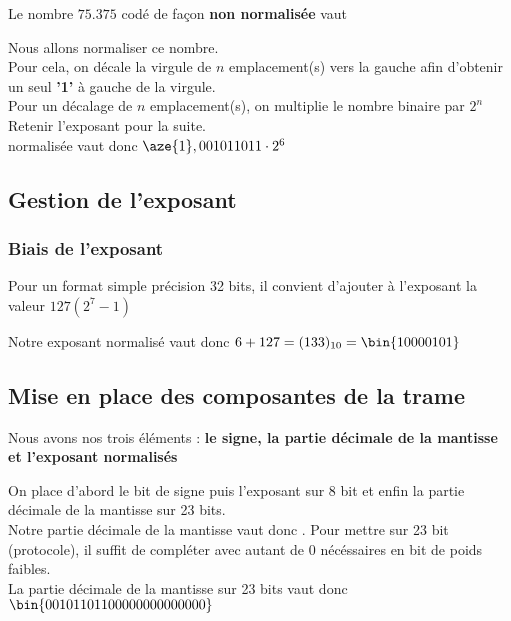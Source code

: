\documentclass[12pt]{report}
\renewcommand{\bold}[1]{\textbf{#1}}
\begin{document}
Le nombre $75.375$ codé de façon \bold{non normalisée} vaut 

Nous allons normaliser ce nombre. \\

Pour cela, on décale la virgule de $n$ emplacement(s) vers la gauche afin d'obtenir un seul \bold{'1'} à gauche de la virgule. \\

Pour un décalage de $n$ emplacement(s), on multiplie le nombre binaire par $2^n$ \\

Retenir l'exposant  pour la suite. \\

 normalisée vaut donc $\aze{1},001011011 \cdot 2^6 $ 

\subsection{Gestion de l'exposant}

\subsubsection{Biais de l'exposant}

Pour un format simple précision 32 bits, il convient d'ajouter à l'exposant la valeur $127 (2^7-1)$

Notre exposant normalisé vaut donc $6+127=(133)_{10} = \bin{10000101}$

\subsection{Mise en place des composantes de la trame}

Nous avons nos trois éléments : \bold{le signe, la partie décimale de la mantisse et l'exposant normalisés}

On place d'abord le bit de signe puis l'exposant sur 8 bit et enfin la partie décimale de la mantisse sur 23 bits. \\

Notre partie décimale de la mantisse vaut donc . Pour mettre sur 23 bit (protocole), il suffit de compléter avec autant de 0 nécéssaires en bit de poids faibles. \\

La partie décimale de la mantisse sur 23 bits vaut donc $\bin{00101101100000000000000}$ \\
\end{document}
